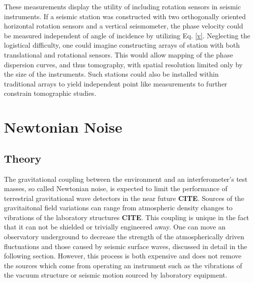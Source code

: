 \documentclass [12pt, proquest]{uwthesis}[2019]
\begin{document}
These measurements display the utility of including rotation sensors in seismic instruments. If a seismic station was constructed with two orthogonally oriented horizontal rotation sensors and a vertical seismometer, the phase velocity could be measured independent of angle of incidence by utilizing Eq. \ref{v}. Neglecting the logistical difficulty, one could imagine constructing arrays of station with both translational and rotational sensors. This would allow mapping of the phase dispersion curves, and thus tomography, with spatial resolution limited only by the size of the instruments. Such stations could also be installed within traditional arrays to yield independent point like measurements to further constrain tomographic studies.

%

\section{Newtonian Noise}
\subsection{Theory}

The gravitational coupling between the environment and an interferometer's test masses, so called Newtonian noise, is expected to limit the performance of terrestrial gravitational wave detectors in the near future \textbf{CITE}. Sources of the gravitaitonal field variations can range from atmospheric density changes to vibrations of the laboratory structures \textbf{CITE}. This coupling is unique in the fact that it can not be shielded or trivially engineered away. One can move an observatory underground to decrease the strength of the atmospherically driven fluctuations and those caused by seismic surface waves, discussed in detail in the following section. However, this process is both expensive and does not remove the sources which come from operating an instrument such as the vibrations of the vacuum structure or seismic motion sourced by laboratory equipment. 
\end{document}
